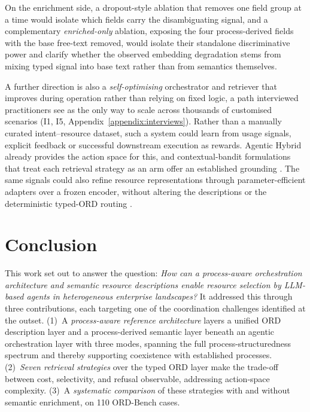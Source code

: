 \documentclass[10pt,twocolumn]{article}
\begin{document}
On the enrichment side, a dropout-style ablation that removes one field group at a time would isolate which fields carry the disambiguating signal, and a complementary \emph{enriched-only} ablation, exposing the four process-derived fields with the base free-text removed, would isolate their standalone discriminative power and clarify whether the observed embedding degradation stems from mixing typed signal into base text rather than from semantics themselves.

A further direction is also a \emph{self-optimising} orchestrator and retriever that improves during operation rather than relying on fixed logic, a path interviewed practitioners see as the only way to scale across thousands of customised scenarios (I1, I5, Appendix~\ref{appendix:interviews}). Rather than a manually curated intent--resource dataset, such a system could learn from usage signals, explicit feedback or successful downstream execution as rewards. Agentic Hybrid already provides the action space for this, and contextual-bandit formulations that treat each retrieval strategy as an arm offer an established grounding \citep{xu_neural_2020,tang_mba-rag_2025}. The same signals could also refine resource representations through parameter-efficient adapters over a frozen encoder, without altering the descriptions or the deterministic typed-ORD routing \citep{schopf_efficient_2023,gao_simcse_2021}.

\section{Conclusion}
\label{sec:conclusion}

This work set out to answer the question: \textit{How can a process-aware orchestration architecture and semantic resource descriptions enable resource selection by LLM-based agents in heterogeneous enterprise landscapes?} It addressed this through three contributions, each targeting one of the coordination challenges identified at the outset. (1)~A \emph{process-aware reference architecture} layers a unified ORD description layer and a process-derived semantic layer beneath an agentic orchestration layer with three modes, spanning the full process-structuredness spectrum and thereby supporting coexistence with established processes. (2)~\emph{Seven retrieval strategies} over the typed ORD layer make the trade-off between cost, selectivity, and refusal observable, addressing action-space complexity. (3)~A \emph{systematic comparison} of these strategies with and without semantic enrichment, on 110 ORD-Bench cases.
\end{document}
